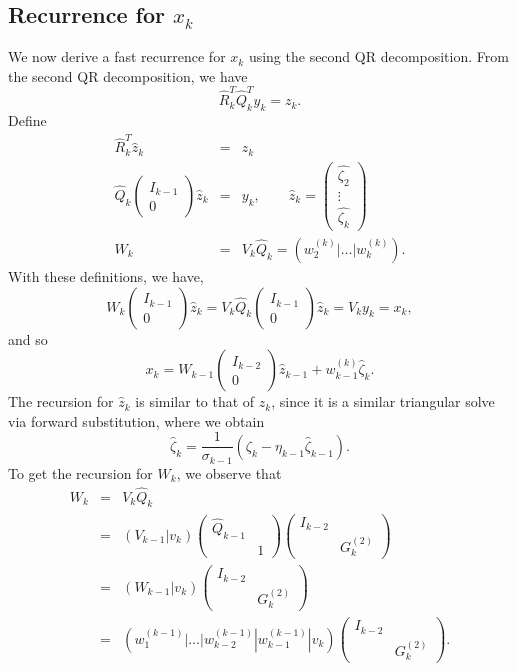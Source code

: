 \documentclass[11pt]{article}
\newcommand{\Ik}{\begin{pmatrix} I_{k-1} \\ 0\end{pmatrix}}
\newcommand{\hQ}{\hat{Q}}
\begin{document}
\subsection{Recurrence for $x_k$}
We now derive a fast recurrence for $x_k$ using the second QR decomposition. From the second QR decomposition, we have
\begin{equation*}
\hat{R}^T_k \hQ^T_k y_k = z_k.
\end{equation*}
Define
\begin{eqnarray}
\hat{R}^T_k \hat{z}_k &=& z_k \\
\label{yzhat} \hQ_k \Ik \hat{z}_k &=& y_k, \qquad \hat{z}_k = \begin{pmatrix} \hat{\zeta_2} \\ \vdots \\ \hat{\zeta_k} \end{pmatrix}  \\
W_k &=& V_k \hQ_k = (w^{(k)}_2 | \dots | w^{(k)}_{k}).
\end{eqnarray}
With these definitions, we have,
$$ W_k \Ik \hat{z}_k = V_k \hQ_k \Ik \hat{z}_k = V_k y_k = x_k,  $$
and so
$$ x_k = W_{k-1} \begin{pmatrix} I_{k-2} \\ 0\end{pmatrix} \hat{z}_{k-1} + w^{(k)}_{k-1} \hat{\zeta}_k. $$
The recursion for $\hat{z}_k$ is similar to that of $z_k$, since it is a similar triangular solve via forward substitution, where we obtain
\begin{equation}
\hat{\zeta}_k = \frac{1}{\sigma_{k-1}} ( \zeta_k - \eta_{k-1} \hat{\zeta}_{k-1} ).
\end{equation}
To get the recursion for $W_k$, we observe that
\begin{eqnarray}
W_k &=& V_k \hQ_k \\
&=& (V_{k-1} | v_k) \begin{pmatrix}
\hQ_{k-1} & \\ & 1
\end{pmatrix} \begin{pmatrix}
I_{k-2} & \\ & G^{(2)}_k
\end{pmatrix} \\
&=& (W_{k-1} | v_k) \begin{pmatrix}
I_{k-2} & \\ & G^{(2)}_k
\end{pmatrix} \\
&=& (w^{(k-1)}_1 | \dots | w^{(k-1)}_{k-2} | w^{(k-1)}_{k-1} | v_k) \begin{pmatrix}
I_{k-2} & \\ & G^{(2)}_k
\end{pmatrix}.
\end{eqnarray}
\end{document}
